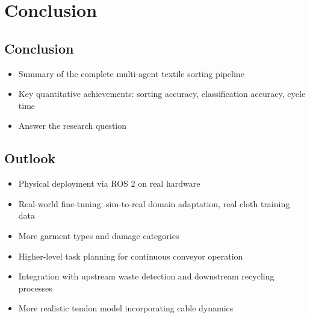 \chapter{Conclusion}\label{ch:conclusion}

\section{Conclusion}
\begin{itemize}
    \item Summary of the complete multi-agent textile sorting pipeline
    \item Key quantitative achievements: sorting accuracy, classification accuracy, cycle time
    \item Answer the research question
\end{itemize}

\section{Outlook}
\begin{itemize}
    \item Physical deployment via ROS 2 on real hardware
    \item Real-world fine-tuning: sim-to-real domain adaptation, real cloth training data
    \item More garment types and damage categories
    \item Higher-level task planning for continuous conveyor operation
    \item Integration with upstream waste detection and downstream recycling processes
    \item More realistic tendon model incorporating cable dynamics
\end{itemize}
